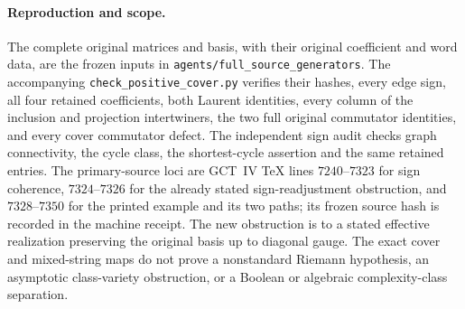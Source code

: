 \paragraph{Reproduction and scope.}
The complete original matrices and basis, with their original
coefficient and word data, are the frozen inputs in
\texttt{agents/full\_source\_generators}. The accompanying
\texttt{check\_positive\_cover.py} verifies their hashes, every edge
sign, all four retained coefficients, both Laurent identities, every
column of the inclusion and projection intertwiners, the two full
original commutator identities, and every cover commutator defect.
The independent sign audit checks graph connectivity, the cycle
class, the shortest-cycle assertion and the same retained entries.
The primary-source loci are GCT~IV TeX lines $7240$--$7323$
for sign coherence, $7324$--$7326$ for the already stated
sign-readjustment obstruction, and $7328$--$7350$ for the printed
example and its two paths; its frozen source hash is recorded in
the machine receipt. The new obstruction is to a stated effective
realization preserving the original basis up to diagonal gauge.
The exact cover and mixed-string maps do not prove a nonstandard
Riemann hypothesis, an asymptotic class-variety obstruction, or a
Boolean or algebraic complexity-class separation.
